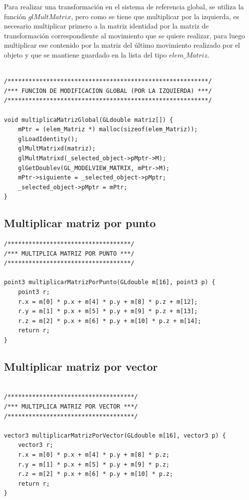\documentclass[12pt,a4paper]{article}
\begin{document}
Para realizar una transformación en el sistema de referencia global,  se utiliza la función $glMultMatrix$, pero como se tiene que multiplicar por la izquierda, es necesario multiplicar primero a la matriz identidad por la matriz de transformación correspondiente al movimiento que se quiere realizar, para luego multiplicar ese contenido por la matriz del último movimiento realizado por el objeto y que se mantiene guardado en la lista del tipo $elem\_Matriz$.


\begin{lstlisting}

/*********************************************************/
/*** FUNCION DE MODIFICACION GLOBAL (POR LA IZQUIERDA) ***/
/*********************************************************/

void multiplicaMatrizGlobal(GLdouble matriz[]) {
    mPtr = (elem_Matriz *) malloc(sizeof(elem_Matriz));
    glLoadIdentity();
    glMultMatrixd(matriz);
    glMultMatrixd(_selected_object->pMptr->M);
    glGetDoublev(GL_MODELVIEW_MATRIX, mPtr->M);
    mPtr->siguiente = _selected_object->pMptr;
    _selected_object->pMptr = mPtr;
}

\end{lstlisting}

\subsection{Multiplicar matriz por punto}

\begin{lstlisting}
/***********************************/
/*** MULTIPLICA MATRIZ POR PUNTO ***/
/***********************************/

point3 multiplicarMatrizPorPunto(GLdouble m[16], point3 p) {
    point3 r;
    r.x = m[0] * p.x + m[4] * p.y + m[8] * p.z + m[12];
    r.y = m[1] * p.x + m[5] * p.y + m[9] * p.z + m[13];
    r.z = m[2] * p.x + m[6] * p.y + m[10] * p.z + m[14];
    return r;
}

\end{lstlisting}


\subsection{Multiplicar matriz por vector}

\begin{lstlisting}

/************************************/
/*** MULTIPLICA MATRIZ POR VECTOR ***/
/************************************/

vector3 multiplicarMatrizPorVector(GLdouble m[16], vector3 p) {
    vector3 r;
    r.x = m[0] * p.x + m[4] * p.y + m[8] * p.z;
    r.y = m[1] * p.x + m[5] * p.y + m[9] * p.z;
    r.z = m[2] * p.x + m[6] * p.y + m[10] * p.z;
    return r;
}

\end{lstlisting}
\end{document}
